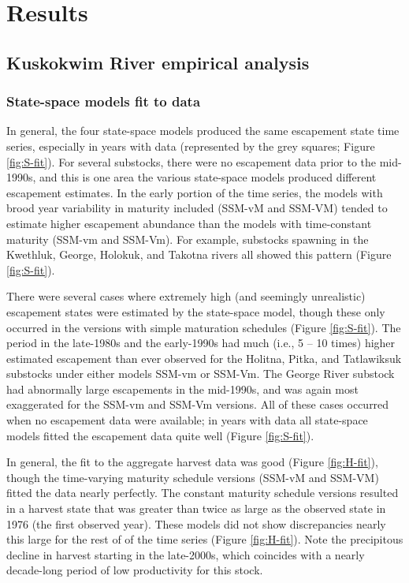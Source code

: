 \documentclass[12pt,]{book}
\theoremstyle{definition}
\theoremstyle{definition}
\theoremstyle{definition}
\theoremstyle{remark}
\begin{document}
\section{Results}\label{results-2}

\subsection{Kuskokwim River empirical
analysis}\label{kuskokwim-river-empirical-analysis}

\subsubsection{State-space models fit to data}\label{ssm-fit}

\noindent
In general, the four state-space models produced the same escapement
state time series, especially in years with data (represented by the
grey squares; Figure \ref{fig:S-fit}). For several substocks, there were
no escapement data prior to the mid-1990s, and this is one area the
various state-space models produced different escapement estimates. In
the early portion of the time series, the models with brood year
variability in maturity included (SSM-vM and SSM-VM) tended to estimate
higher escapement abundance than the models with time-constant maturity
(SSM-vm and SSM-Vm). For example, substocks spawning in the Kwethluk,
George, Holokuk, and Takotna rivers all showed this pattern (Figure
\ref{fig:S-fit}).

There were several cases where extremely high (and seemingly
unrealistic) escapement states were estimated by the state-space model,
though these only occurred in the versions with simple maturation
schedules (Figure \ref{fig:S-fit}). The period in the late-1980s and the
early-1990s had much (i.e., 5 -- 10 times) higher estimated escapement
than ever observed for the Holitna, Pitka, and Tatlawiksuk substocks
under either models SSM-vm or SSM-Vm. The George River substock had
abnormally large escapements in the mid-1990s, and was again most
exaggerated for the SSM-vm and SSM-Vm versions. All of these cases
occurred when no escapement data were available; in years with data all
state-space models fitted the escapement data quite well (Figure
\ref{fig:S-fit}).

In general, the fit to the aggregate harvest data was good (Figure
\ref{fig:H-fit}), though the time-varying maturity schedule versions
(SSM-vM and SSM-VM) fitted the data nearly perfectly. The constant
maturity schedule versions resulted in a harvest state that was greater
than twice as large as the observed state in 1976 (the first observed
year). These models did not show discrepancies nearly this large for the
rest of of the time series (Figure \ref{fig:H-fit}). Note the
precipitous decline in harvest starting in the late-2000s, which
coincides with a nearly decade-long period of low productivity for this
stock.
\end{document}

